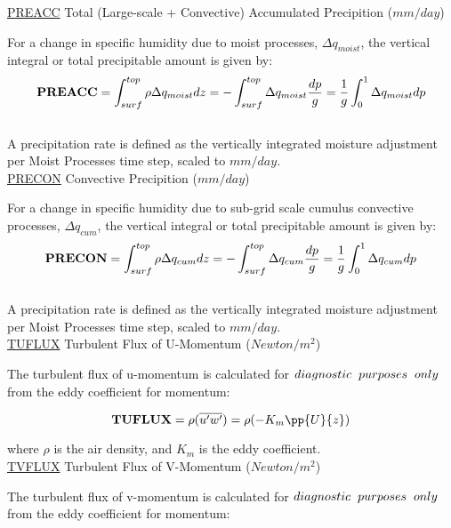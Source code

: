 \noindent
{ \underline {PREACC} Total (Large-scale + Convective) Accumulated Precipition ($mm/day$) } 

\noindent
For a change in specific humidity due to moist processes, $\Delta q_{moist}$, 
the vertical integral or total precipitable amount is given by:   
\[
{\bf PREACC} = \int_{surf}^{top} \rho \Delta q_{moist} dz = - \int_{surf}^{top} \Delta  q_{moist}
{dp \over g} = {1 \over g} \int_0^1 \Delta q_{moist} dp
\]
\\

\noindent
A precipitation rate is defined as the vertically integrated moisture adjustment per Moist Processes
time step, scaled to $mm/day$.
\\

\noindent
{ \underline {PRECON} Convective Precipition ($mm/day$) } 

\noindent
For a change in specific humidity due to sub-grid scale cumulus convective processes, $\Delta q_{cum}$, 
the vertical integral or total precipitable amount is given by:   
\[
{\bf PRECON} = \int_{surf}^{top} \rho \Delta q_{cum} dz = - \int_{surf}^{top} \Delta  q_{cum}
{dp \over g} = {1 \over g} \int_0^1 \Delta q_{cum} dp
\]
\\

\noindent
A precipitation rate is defined as the vertically integrated moisture adjustment per Moist Processes
time step, scaled to $mm/day$.
\\

\noindent
{ \underline {TUFLUX}  Turbulent Flux of U-Momentum ($Newton/m^2$) }

\noindent
The turbulent flux of u-momentum is calculated for $diagnostic \hspace{.2cm} purposes
 \hspace{.2cm} only$ from the eddy coefficient for momentum:

\[
{\bf TUFLUX} =  {\rho } {(\overline{u^{\prime}w^{\prime}})} =  
{\rho } {(- K_m \pp{U}{z})}
\]
 
\noindent
where $\rho$ is the air density, and $K_m$ is the eddy coefficient.
\\

\noindent
{ \underline {TVFLUX}  Turbulent Flux of V-Momentum ($Newton/m^2$) }

\noindent
The turbulent flux of v-momentum is calculated for $diagnostic \hspace{.2cm} purposes 
\hspace{.2cm} only$ from the eddy coefficient for momentum:

